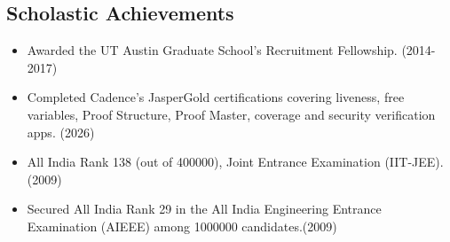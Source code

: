 \documentclass[margin]{res}
\begin{document}
\begin{resume}
\section{Scholastic Achievements}
 \begin{itemize} \itemsep -2pt  %
 \item Awarded the UT Austin Graduate School's Recruitment
   Fellowship. \hfill (2014-2017)
 \item Completed Cadence's JasperGold certifications covering liveness, free variables, Proof Structure, Proof Master, coverage and security verification apps. \hfill(2026)
 \item All India Rank 138 (out of 400000), Joint Entrance Examination
   (IIT-JEE). \hfill (2009)
 \item Secured All India Rank 29 in the All India Engineering Entrance
   Examination (AIEEE) among 1000000 candidates.\hfill (2009)
 \end{itemize}

\end{resume}
\end{document}
